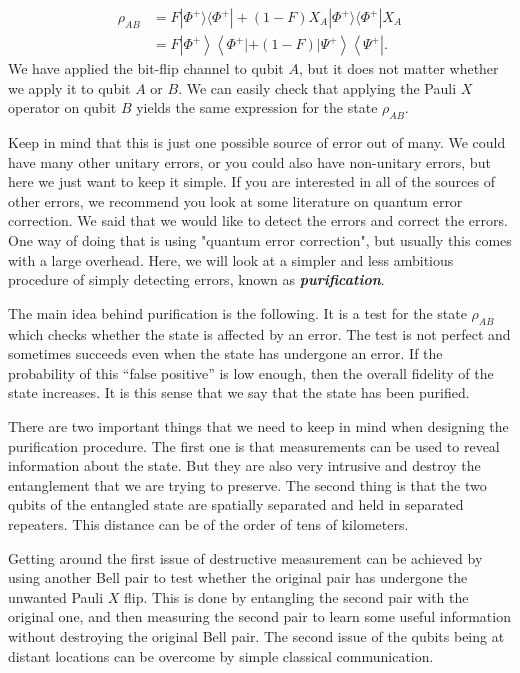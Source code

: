 \begin{align}
    \rho_{AB} & = F|\Phi^{+}\rangle\langle\Phi^{+}|+(1-F) X_A| \Phi^{+}\rangle\langle\Phi^{+}| X_A \nonumber\\
    & = F \left|\Phi^{+}\right\rangle\left\langle\Phi^{+}|+(1-F)| \Psi^{+}\right\rangle\left\langle\Psi^{+}\right|.
    \label{eq:12-4_bitflip_mixed_state}
\end{align}
We have applied the bit-flip channel to qubit $A$, but it does not matter whether we apply it to qubit $A$ or $B$.
We can easily check that applying the Pauli $X$ operator on qubit $B$ yields the same expression for the state $\rho_{AB}$.

Keep in mind that this is just one possible source of error out of many.
We could have many other unitary errors, or you could also have non-unitary errors, but here we just want to keep it simple.
If you are interested in all of the sources of other errors, we recommend you look at some literature on quantum error correction.
We said that we would like to detect the errors and correct the errors. One way of doing that is using "quantum error correction", but usually this comes with a large overhead.
Here, we will look at a simpler and less ambitious procedure of simply detecting errors, known as \textit{\textbf{purification}}.

The main idea behind purification is the following.
It is a test for the state $\rho_{AB}$ which checks whether the state is affected by an error.
The test is not perfect and sometimes succeeds even when the state has undergone an error.
If the probability of this ``false positive'' is low enough, then the overall fidelity of the state increases.
It is this sense that we say that the state has been purified.

There are two important things that we need to keep in mind when designing the purification procedure.
The first one is that measurements can be used to reveal information about the state.
But they are also very intrusive and destroy the entanglement that we are trying to preserve.
The second thing is that the two qubits of the entangled state are spatially separated and held in separated repeaters.
This distance can be of the order of tens of kilometers.

Getting around the first issue of destructive measurement can be achieved by using another Bell pair to test whether the original pair has undergone the unwanted Pauli $X$ flip.
This is done by entangling the second pair with the original one, and then measuring the second pair to learn some useful information without destroying the original Bell pair.
The second issue of the qubits being at distant locations can be overcome by simple classical communication.

